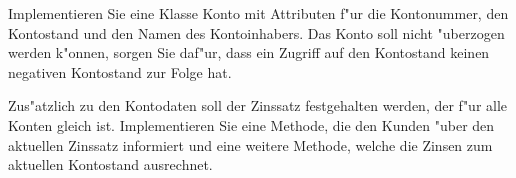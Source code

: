 \begin{aufgabe}[Konto]
\begin{teilaufgabe}
Implementieren Sie eine Klasse Konto mit Attributen f"ur die Kontonummer, den Kontostand und den Namen des Kontoinhabers. Das Konto soll nicht "uberzogen werden k"onnen, sorgen Sie daf"ur, dass ein Zugriff auf den Kontostand keinen negativen Kontostand zur Folge hat.
\end{teilaufgabe}
\begin{teilaufgabe}
Zus"atzlich zu den Kontodaten soll der Zinssatz festgehalten werden, der f"ur alle Konten gleich ist. Implementieren Sie eine Methode, die den Kunden "uber den aktuellen Zinssatz informiert und eine weitere Methode, welche die Zinsen zum aktuellen Kontostand ausrechnet.
\end{teilaufgabe}
\end{aufgabe}

